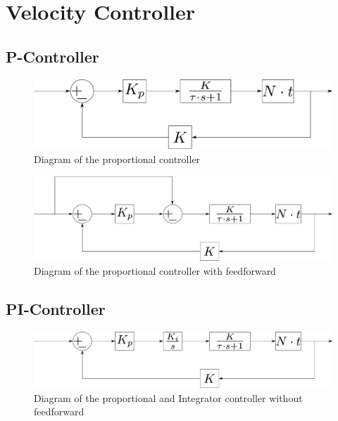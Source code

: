 \section{Velocity Controller}


\subsection{P-Controller}



 \begin{figure}[H]
 	\centering
 	\includegraphics[scale=0.4]{figures/proportionalController.pdf}
 	\caption{Diagram of the proportional controller}
 	\label{proportionalController}
 \end{figure}
 
  \begin{figure}[H]
  	\centering
  	\includegraphics[scale=0.4]{figures/proportionalControllerWithFeedforward.pdf}
  	\caption{Diagram of the proportional controller with feedforward}
  	\label{proportionalControllerWithFeedforward}
  \end{figure}
 





\subsection{PI-Controller}

  \begin{figure}[H]
  	\centering
  	\includegraphics[scale=0.4]{figures/proportionalIntegratorController.pdf}
  	\caption{Diagram of the proportional and Integrator controller without feedforward}
  	\label{proportionalIntegratorController}
  \end{figure}